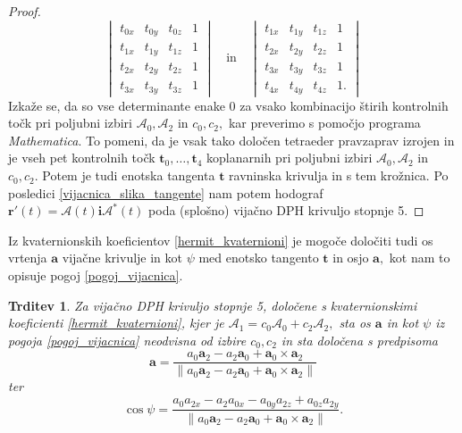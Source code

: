 \documentclass[12pt,a4paper,twoside]{article}
\theoremstyle{definition} %
\theoremstyle{plain} %
\newtheorem{trditev}[definicija]{Trditev}
\theoremstyle{primerstyle}
\numberwithin{equation}{section}  %
\newcommand{\tV}{\mathbf{t}}
\newcommand{\aV}{\mathbf{a}}
\newcommand{\rV}{\mathbf{r}}
\newcommand{\iV}{\mathbf{i}}
\newcommand{\AQ}{\mathcal{A}}
\begin{document}
\begin{proof}
	\begin{equation}
		\label{determinanti_tetraeder}
		\begin{vmatrix}
			t_{0x}&t_{0y}&t_{0z}&1\\
			t_{1x}&t_{1y}&t_{1z}&1\\
			t_{2x}&t_{2y}&t_{2z}&1\\
			t_{3x}&t_{3y}&t_{3z}&1
		\end{vmatrix}
		\quad\text{in}\quad
		\begin{vmatrix}
			t_{1x}&t_{1y}&t_{1z}&1\\
			t_{2x}&t_{2y}&t_{2z}&1\\
			t_{3x}&t_{3y}&t_{3z}&1\\
			t_{4x}&t_{4y}&t_{4z}&1.
		\end{vmatrix}
	\end{equation}
	Izkaže se, da so vse determinante enake 0 za vsako kombinacijo štirih kontrolnih točk pri poljubni izbiri $\AQ_0,\AQ_2$ in $c_0,c_2,$ kar preverimo s pomočjo programa \emph{Mathematica}. To pomeni, da je vsak tako določen tetraeder pravzaprav izrojen in je vseh pet kontrolnih točk $\tV_0,\dots,\tV_4$ koplanarnih pri poljubni izbiri $\AQ_0,\AQ_2$ in $c_0,c_2.$ Potem je tudi enotska tangenta $\tV$ ravninska krivulja in s tem krožnica. Po posledici \ref{vijacnica_slika_tangente} nam potem hodograf $\rV'(t)=\AQ(t)\iV\AQ^*(t)$ poda (splošno) vijačno DPH krivuljo stopnje 5.
\end{proof}
Iz kvaternionskih koeficientov \eqref{hermit_kvaternioni} je mogoče določiti tudi os vrtenja $\aV$ vijačne krivulje in kot $\psi$ med enotsko tangento $\tV$ in osjo $\aV,$ kot nam to opisuje pogoj \eqref{pogoj_vijacnica}.
\begin{trditev}
	\label{os_kot_helix}
	Za vijačno DPH krivuljo stopnje 5, določene s kvaternionskimi koeficienti \eqref{hermit_kvaternioni}, kjer je $\AQ_1=c_0\AQ_0+c_2\AQ_2,$ sta os $\aV$ in kot $\psi$ iz pogoja \eqref{pogoj_vijacnica} neodvisna od izbire $c_0,c_2$ in sta določena s predpisoma
	\begin{equation}
		\label{predpis_os_helix}
		\aV=\frac{a_0\aV_2-a_2\aV_0+\aV_0\times\aV_2}{\lVert a_0\aV_2-a_2\aV_0+\aV_0\times\aV_2\rVert}
	\end{equation}
	ter
	\begin{equation}
		\label{predpis_kot_helix}
		\cos\psi=\frac{a_0a_{2x}-a_2a_{0x}-a_{0y}a_{2z}+a_{0z}a_{2y}}{\lVert a_0\aV_2-a_2\aV_0+\aV_0\times\aV_2\rVert}.
	\end{equation}
\end{trditev}
\end{document}
